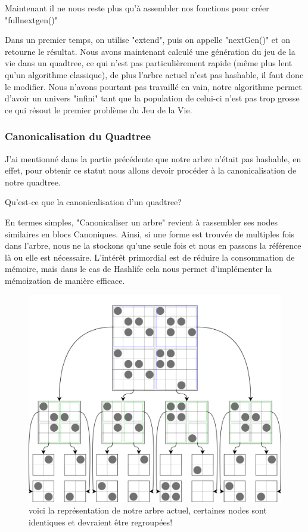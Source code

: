 Maintenant il ne nous reste plus qu'à assembler nos fonctions pour créer "fullnextgen()"

Dans un premier temps, on utilise "extend", puis on appelle "nextGen()" et on retourne le résultat. Nous avons maintenant calculé une génération du jeu de la vie dans un quadtree, ce qui n'est pas particulièrement rapide (même plus lent qu'un algorithme classique), de plus l'arbre actuel n'est pas hashable, il faut donc le modifier. Nous n'avons pourtant pas travaillé en vain, notre algorithme permet d'avoir un univers "infini" tant que la population de celui-ci n'est pas trop grosse ce qui résout le premier problème du Jeu de la Vie.

\subsubsection{Canonicalisation du Quadtree}
J'ai mentionné dans la partie précédente que notre arbre n'était pas hashable, en effet, pour obtenir ce statut nous allons devoir procéder à la canonicalisation de notre quadtree.

Qu'est-ce que la canonicalisation d'un quadtree?

En termes simples, "Canonicaliser un arbre" revient à rassembler ses nodes similaires en blocs Canoniques. Ainsi, si une forme est trouvée de multiples fois dans l'arbre, nous ne la stockons qu'une seule fois et nous en passons la référence là ou elle est nécessaire. L'intérêt primordial est de réduire la consommation de mémoire, mais dans le cas de Hashlife cela nous permet d'implémenter la mémoization de manière efficace.

\begin{figure}[H]
        \center
        \includegraphics[scale=0.16]{images/imgHashlife/quadtreeNONcanonique.png}
        \caption{voici la représentation de notre arbre actuel, certaines nodes sont identiques et devraient être regroupées!}
\end{figure}

